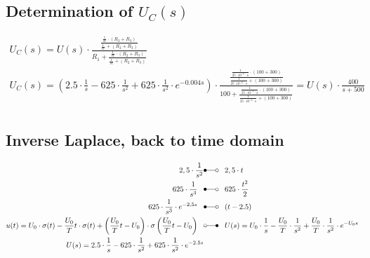 \documentclass[a4paper]{article}
\begin{document}
\subsection{Determination of $U_C(s)$}
\begin{align*}
	U_C(s) = U(s) \cdot \frac{\frac{\frac{1}{sc}\cdot (R_2+R_3)}{\frac{1}{sc} + (R_2+R_3)}}{R_1 + \frac{\frac{1}{sc}\cdot (R_2+R_3)}{\frac{1}{sc} + (R_2+R_3)}}\\
	U_C(s) = \left(2.5 \cdot \frac{1}{s} - 625 \cdot \frac{1}{s^2} + 625 \cdot \frac{1}{s^2} \cdot e^{-0.004s} \right) \cdot \frac{\frac{\frac{1}{25\cdot10^{-6}\cdot s}\cdot (100+300)}{\frac{1}{25\cdot10^{-6}\cdot s} + (100+300)}}
	{100 + \frac{\frac{1}{25\cdot10^{-6}\cdot s}\cdot (100+300)}{\frac{1}{25\cdot10^{-6}\cdot s} + (100+300)}} =
	U(s) \cdot \frac{400}{s+500}\\
\end{align*}

\subsection{Inverse Laplace, back to time domain}

\begin{align*}
	2,5\cdot\frac{1}{s^2} &\Laplace \;\;\; 2,5\cdot t\\
	625\cdot \frac{1}{s^3} \;\;\; &\Laplace \;\;\; 625\cdot \frac{t^2}{2}\\
	625\cdot \frac{1}{s^3} \cdot e^{-2,5s}\;\;\; &\Laplace \;\;\; 
	(t-2.5)\\
	u(t) = U_0 \cdot \sigma(t) - \frac{U_0}{T}t \cdot \sigma(t) + \left(\frac{U_0}{T}t-U_0 \right) \cdot \sigma\left(\frac{U_0}{T}t-U_0 \right) \;\;\; &\laplace \;\;\;
	U(s) = U_0 \cdot \frac{1}{s} - \frac{U_0}{T} \cdot \frac{1}{s^2} + \frac{U_0}{T} \cdot \frac{1}{s^2} \cdot e^{-U_0s}\\
	U(s) = 2.5 \cdot \frac{1}{s} - 625 \cdot \frac{1}{s^2} + 625 \cdot \frac{1}{s^2} \cdot e^{-2.5s}\\
\end{align*}
\end{document}
